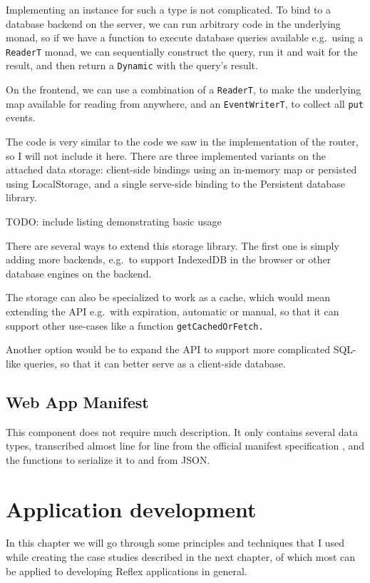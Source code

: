 \documentclass[english,odsaz]{fitthesis}
\begin{document}
Implementing an instance for such a type is not complicated. To
bind to a database backend on the server, we can run arbitrary code in the
underlying monad, so if we have a function to execute database
queries available e.g.~using a \texttt{ReaderT} monad, we can sequentially construct the
query, run it and wait for the result, and then return a \texttt{Dynamic} with the
query's result.

On the frontend, we can use a combination of a \texttt{ReaderT}, to
make the underlying map available for reading from anywhere, and an
\texttt{EventWriterT}, to collect all \texttt{put} events.

The code is very similar to the code we saw in the implementation of the router,
so I will not include it here. There are three implemented variants on the
attached data storage: client-side bindings using an in-memory map or persisted
using LocalStorage, and a single serve-side binding to the Persistent database library.

TODO: include listing demonstrating basic usage

There are several ways to extend this storage library. The first one is simply
adding more backends, e.g.~to support IndexedDB in the browser or other database
engines on the backend.

The storage can also be specialized to work as a cache, which would mean
extending the API e.g.~with expiration, automatic or manual, so that it can
support other use-cases like a function \texttt{getCachedOrFetch.}

Another option would be to expand the API to support more complicated SQL-like
queries, so that it can better serve as a client-side database.

\section{Web App Manifest}
\label{sec:org8337671}
This component does not require much description. It only contains several data
types, transcribed almost line for line from the official manifest specification
\cite{webapp-manifest}, and the functions to serialize it to and from JSON.

\chapter{Application development}
\label{sec:org309e107}
In this chapter we will go through some principles and techniques that I used
while creating the case studies described in the next chapter, of which most can
be applied to developing Reflex applications in general.
\end{document}
